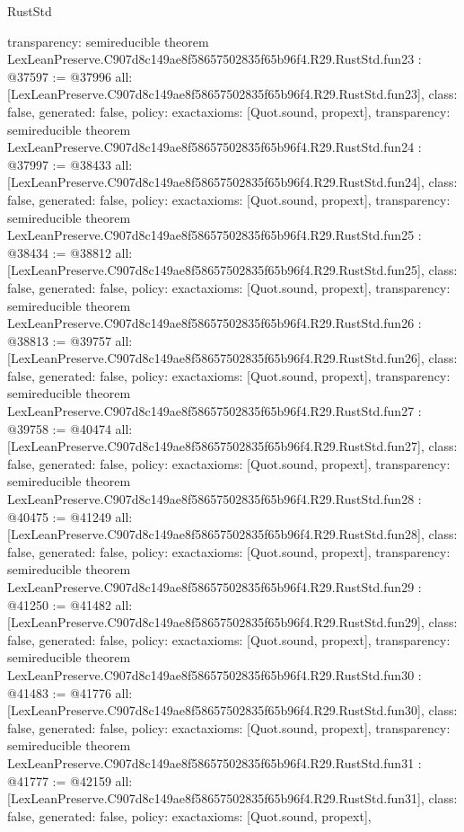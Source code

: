 \begin{lexlean}{RustStd}
\begin{coremodule}
{  transparency: semireducible
}
theorem LexLeanPreserve.C907d8c149ae8f58657502835f65b96f4.R29.RustStd.fun23 : @37597 := @37996 {
  all: [LexLeanPreserve.C907d8c149ae8f58657502835f65b96f4.R29.RustStd.fun23],
  class: false,
  generated: false,
  policy: exact{axioms: [Quot.sound, propext]},
  transparency: semireducible
}
theorem LexLeanPreserve.C907d8c149ae8f58657502835f65b96f4.R29.RustStd.fun24 : @37997 := @38433 {
  all: [LexLeanPreserve.C907d8c149ae8f58657502835f65b96f4.R29.RustStd.fun24],
  class: false,
  generated: false,
  policy: exact{axioms: [Quot.sound, propext]},
  transparency: semireducible
}
theorem LexLeanPreserve.C907d8c149ae8f58657502835f65b96f4.R29.RustStd.fun25 : @38434 := @38812 {
  all: [LexLeanPreserve.C907d8c149ae8f58657502835f65b96f4.R29.RustStd.fun25],
  class: false,
  generated: false,
  policy: exact{axioms: [Quot.sound, propext]},
  transparency: semireducible
}
theorem LexLeanPreserve.C907d8c149ae8f58657502835f65b96f4.R29.RustStd.fun26 : @38813 := @39757 {
  all: [LexLeanPreserve.C907d8c149ae8f58657502835f65b96f4.R29.RustStd.fun26],
  class: false,
  generated: false,
  policy: exact{axioms: [Quot.sound, propext]},
  transparency: semireducible
}
theorem LexLeanPreserve.C907d8c149ae8f58657502835f65b96f4.R29.RustStd.fun27 : @39758 := @40474 {
  all: [LexLeanPreserve.C907d8c149ae8f58657502835f65b96f4.R29.RustStd.fun27],
  class: false,
  generated: false,
  policy: exact{axioms: [Quot.sound, propext]},
  transparency: semireducible
}
theorem LexLeanPreserve.C907d8c149ae8f58657502835f65b96f4.R29.RustStd.fun28 : @40475 := @41249 {
  all: [LexLeanPreserve.C907d8c149ae8f58657502835f65b96f4.R29.RustStd.fun28],
  class: false,
  generated: false,
  policy: exact{axioms: [Quot.sound, propext]},
  transparency: semireducible
}
theorem LexLeanPreserve.C907d8c149ae8f58657502835f65b96f4.R29.RustStd.fun29 : @41250 := @41482 {
  all: [LexLeanPreserve.C907d8c149ae8f58657502835f65b96f4.R29.RustStd.fun29],
  class: false,
  generated: false,
  policy: exact{axioms: [Quot.sound, propext]},
  transparency: semireducible
}
theorem LexLeanPreserve.C907d8c149ae8f58657502835f65b96f4.R29.RustStd.fun30 : @41483 := @41776 {
  all: [LexLeanPreserve.C907d8c149ae8f58657502835f65b96f4.R29.RustStd.fun30],
  class: false,
  generated: false,
  policy: exact{axioms: [Quot.sound, propext]},
  transparency: semireducible
}
theorem LexLeanPreserve.C907d8c149ae8f58657502835f65b96f4.R29.RustStd.fun31 : @41777 := @42159 {
  all: [LexLeanPreserve.C907d8c149ae8f58657502835f65b96f4.R29.RustStd.fun31],
  class: false,
  generated: false,
  policy: exact{axioms: [Quot.sound, propext]},
}
\end{coremodule}
\end{lexlean}
